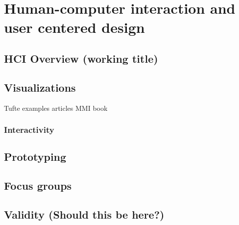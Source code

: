 \chapter{Human-computer interaction and user centered design}

\section{HCI Overview (working title)}

\section{Visualizations}
Tufte examples articles MMI book
\subsection{Interactivity}

\section{Prototyping}

\section{Focus groups}

\section{Validity (Should this be here?)}


